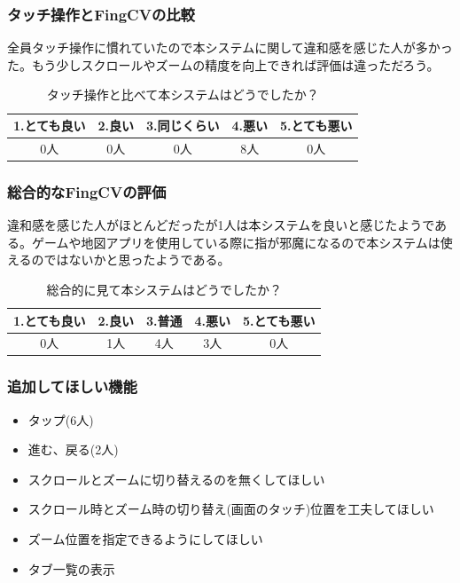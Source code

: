 \documentclass[11pt,a4j, titlepage]{jarticle} %
\begin{document}
\subsubsection{タッチ操作とFingCVの比較}
全員タッチ操作に慣れていたので本システムに関して違和感を感じた人が多かった。もう少しスクロールやズームの精度を向上できれば評価は違っただろう。

\begin{table}[H]
	\begin{center}
	\begin{tabular}{|c|c|c|c|c|} \hline
		1.とても良い & 2.良い & 3.同じくらい & 4.悪い & 5.とても悪い \\ \hline \hline
		0人 & 0人 & 0人 & 8人 & 0人  \\ \hline
	\end{tabular}
	\caption{タッチ操作と比べて本システムはどうでしたか？}
	\label{table7}
	\end{center}
\end{table}

\subsubsection{総合的なFingCVの評価}
違和感を感じた人がほとんどだったが1人は本システムを良いと感じたようである。ゲームや地図アプリを使用している際に指が邪魔になるので本システムは使えるのではないかと思ったようである。

\begin{table}[H]
	\begin{center}
	\begin{tabular}{|c|c|c|c|c|} \hline
		1.とても良い & 2.良い & 3.普通 & 4.悪い & 5.とても悪い \\ \hline \hline
		0人 & 1人 & 4人 & 3人 & 0人  \\ \hline
	\end{tabular}
	\caption{総合的に見て本システムはどうでしたか？}
	\label{table8}
	\end{center}
\end{table}

\subsubsection{追加してほしい機能}

\begin{itemize}
	\item タップ(6人)
	\item 進む、戻る(2人)
	\item スクロールとズームに切り替えるのを無くしてほしい
	\item スクロール時とズーム時の切り替え(画面のタッチ)位置を工夫してほしい
	\item ズーム位置を指定できるようにしてほしい
	\item タブ一覧の表示
\end{itemize}
\end{document}
